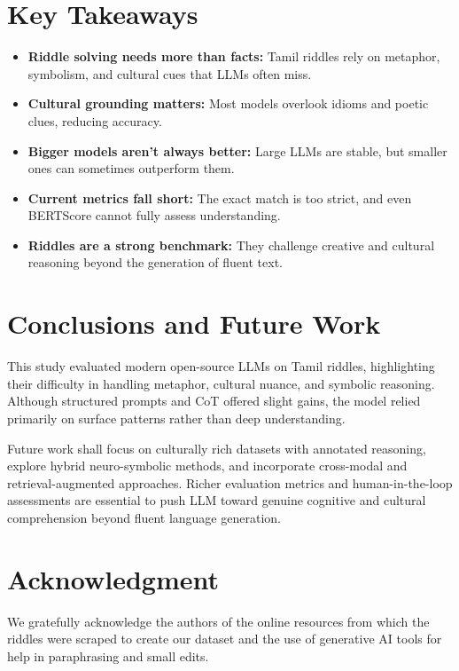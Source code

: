 \documentclass[11pt]{article}
\begin{document}
\section{Key Takeaways}
\begin{itemize}
    \item \textbf{Riddle solving needs more than facts:} Tamil riddles rely on metaphor, symbolism, and cultural cues that LLMs often miss.
    \item \textbf{Cultural grounding matters:} Most models overlook idioms and poetic clues, reducing accuracy.
    \item \textbf{Bigger models aren’t always better:} Large LLMs are stable, but smaller ones can sometimes outperform them.
    \item \textbf{Current metrics fall short:} The exact match is too strict, and even BERTScore cannot fully assess understanding.
    \item \textbf{Riddles are a strong benchmark:} They challenge creative and cultural reasoning beyond the generation of fluent text.
\end{itemize}

\section{Conclusions and Future Work}This study evaluated modern open-source LLMs on Tamil riddles, highlighting their difficulty in handling metaphor, cultural nuance, and symbolic reasoning. Although structured prompts and CoT offered slight gains, the model relied primarily on surface patterns rather than deep understanding.

Future work shall focus on culturally rich datasets with annotated reasoning, explore hybrid neuro-symbolic methods, and incorporate cross-modal and retrieval-augmented approaches. Richer evaluation metrics and human-in-the-loop assessments are essential to push LLM toward genuine cognitive and cultural comprehension beyond fluent language generation.

\section*{Acknowledgment}
We gratefully acknowledge the authors of the online resources from which the riddles were scraped to create our dataset and the use of generative AI tools for help in paraphrasing and small edits.
\end{document}
